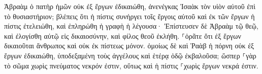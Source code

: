 \documentclass{openreader}
\begin{document}
Ἀβραὰμ ὁ πατὴρ ἡμῶν οὐκ ἐξ ἔργων ἐδικαιώθη, ἀνενέγκας Ἰσαὰκ τὸν υἱὸν αὐτοῦ ἐπὶ τὸ θυσιαστήριον; 
βλέπεις ὅτι ἡ πίστις συνήργει τοῖς ἔργοις αὐτοῦ καὶ ἐκ τῶν ἔργων ἡ πίστις ἐτελειώθη, 
καὶ ἐπληρώθη ἡ γραφὴ ἡ λέγουσα· Ἐπίστευσεν δὲ Ἀβραὰμ τῷ θεῷ, καὶ ἐλογίσθη αὐτῷ εἰς δικαιοσύνην, καὶ φίλος θεοῦ ἐκλήθη. 
⸀ὁρᾶτε ὅτι ἐξ ἔργων δικαιοῦται ἄνθρωπος καὶ οὐκ ἐκ πίστεως μόνον. 
ὁμοίως δὲ καὶ Ῥαὰβ ἡ πόρνη οὐκ ἐξ ἔργων ἐδικαιώθη, ὑποδεξαμένη τοὺς ἀγγέλους καὶ ἑτέρᾳ ὁδῷ ἐκβαλοῦσα; 
ὥσπερ ⸀γὰρ τὸ σῶμα χωρὶς πνεύματος νεκρόν ἐστιν, οὕτως καὶ ἡ πίστις ⸀χωρὶς ἔργων νεκρά ἐστιν. 
\end{document}
